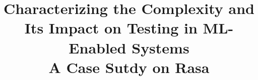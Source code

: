 \documentclass[10pt,conference]{IEEEtran}
\begin{document}
\title{Characterizing the Complexity and Its Impact on Testing in ML-Enabled Systems \\ {\large A Case Sutdy on Rasa}}


\maketitle

\begin{abstract}

\end{abstract}














{\footnotesize


}
\end{document}
